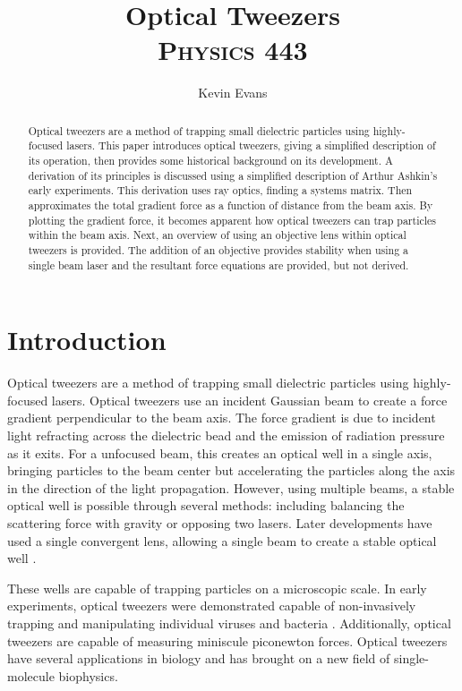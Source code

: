 \documentclass{article}
\title{Optical Tweezers \\
\textsc{\normalsize Physics 443}}
\author{Kevin Evans}
\begin{document}
	\maketitle
	\begin{abstract}
	\noindent Optical tweezers are a method of trapping small dielectric particles using highly-focused lasers. This paper introduces optical tweezers, giving a simplified description of its operation, then provides some historical background on its development. A derivation of its principles is discussed using a simplified description of Arthur Ashkin's early experiments. This derivation uses ray optics, finding a systems matrix. Then approximates the total gradient force as a function of distance from the beam axis. By plotting the gradient force, it becomes apparent how optical tweezers can trap particles within the beam axis. Next, an overview of using an objective lens within optical tweezers is provided. The addition of an objective provides stability when using a single beam laser and the resultant force equations are provided, but not derived.
	\end{abstract}
	
	\pagebreak
	
	\section{Introduction}
	Optical tweezers are a method of trapping small dielectric particles using highly-focused lasers. Optical tweezers use an incident Gaussian beam to create a force gradient perpendicular to the beam axis. The force gradient is due to incident light refracting across the dielectric bead and the emission of radiation pressure as it exits. For a unfocused beam, this creates an optical well in a single axis, bringing particles to the beam center but accelerating the particles along the axis in the direction of the light propagation. However, using multiple beams, a stable optical well is possible through several methods: including balancing the scattering force with gravity \cite{doi:10.1063/1.1653919} or opposing two lasers. Later developments have used a single convergent lens, allowing a single beam to create a stable optical well \cite{Ashkin:86}.
	
		
	These wells are capable of trapping particles on a microscopic scale. In early experiments, optical tweezers were demonstrated capable of non-invasively trapping and manipulating individual viruses and bacteria \cite{Ashkin1517}. Additionally, optical tweezers are capable of measuring miniscule piconewton forces. Optical tweezers have several applications in biology and has brought on a new field of single-molecule biophysics. 
	
\end{document}

